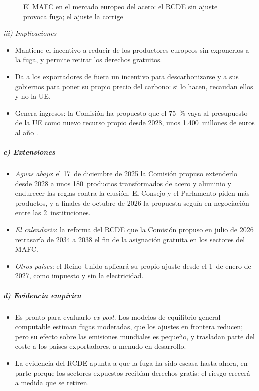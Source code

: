 \documentclass[11pt]{article}
\begin{document}
\begin{figure}[H]
\centering
\caption{El MAFC en el mercado europeo del acero: el RCDE sin ajuste provoca fuga; el ajuste la corrige}\label{fig:mafc}
\end{figure}

\hspace*{3.6em}\emph{iii) Implicaciones}

\begin{itemize}
\item Mantiene el incentivo a reducir de los productores europeos sin exponerlos a la fuga, y permite retirar los derechos gratuitos.
\item Da a los exportadores de fuera un incentivo para descarbonizarse y a sus gobiernos para poner su propio precio del carbono: si lo hacen, recaudan ellos y no la UE.
\item Genera ingresos: la Comisión ha propuesto que el 75~\% vaya al presupuesto de la UE como nuevo recurso propio desde 2028, unos 1.400~millones de euros al año\nocite{EY2025RecursosPropios} .
\end{itemize}

\subparagraph{c) Extensiones}

\begin{itemize}
\item \emph{Aguas abajo}: el 17~de diciembre de 2025 la Comisión propuso extenderlo desde 2028 a unos 180~productos transformados de acero y aluminio y endurecer las reglas contra la elusión\nocite{CE2025COM989}. El Consejo y el Parlamento piden más productos, y a finales de octubre de 2026 la propuesta seguía en negociación entre las 2~instituciones\nocite{MayerBrown2026CBAM}.
\item \emph{El calendario}: la reforma del RCDE que la Comisión propuso en julio de 2026 retrasaría de 2034 a 2038 el fin de la asignación gratuita en los sectores del MAFC\nocite{EPRS2026RevisionETS}.
\item \emph{Otros países}: el Reino Unido aplicará su propio ajuste desde el 1~de enero de 2027, como impuesto y sin la electricidad\nocite{HMRC2025CBAM}.
\end{itemize}

\subparagraph{d) Evidencia empírica}

\begin{itemize}
\item Es pronto para evaluarlo \emph{ex post}. Los modelos de equilibrio general computable estiman fugas moderadas, que los ajustes en frontera reducen; pero su efecto sobre las emisiones mundiales es pequeño, y trasladan parte del coste a los países exportadores, a menudo en desarrollo\nocite{Bohringer2012Role,Bohringer2022Potential}.
\item La evidencia del RCDE apunta a que la fuga ha sido escasa hasta ahora\nocite{Colmer2025Pricing}, en parte porque los sectores expuestos recibían derechos gratis: el riesgo crecerá a medida que se retiren.
\end{itemize}
\end{document}
